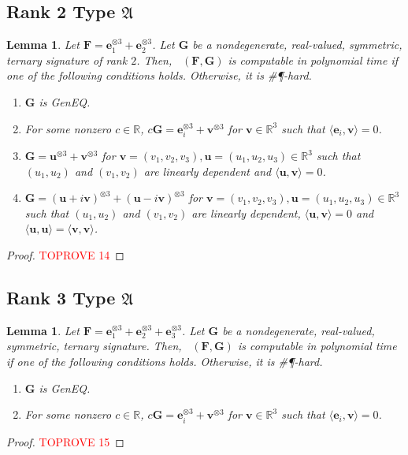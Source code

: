\documentclass[11pt]{article}
\newtheorem{lemma}[theorem]{Lemma}
\DeclareMathOperator{\holts}{Holant^*_3}
\newcommand{\geneq}{\textsf{GenEQ}\xspace}
\newcommand{\sph}{\#\P-hard\xspace}
\newcommand{\teh}{^{\otimes 3}}
\newcommand{\ternarytractgeneq}{$\mathfrak{A}$\xspace}
\begin{document}
\subsection{Rank 2 Type \texorpdfstring{\ternarytractgeneq}{A}}
\begin{lemma}\label{lem:dichotomy-ternary-ternary-rank-2-geneq}
  Let $\mathbf{F} = \mathbf{e}_1\teh + \mathbf{e}_2\teh$.
  Let $\mathbf{G}$ be a nondegenerate, real-valued, symmetric, ternary signature of rank $2$.
  Then, $\holts(\mathbf{F}, \mathbf{G})$ is computable in polynomial time if one of the following conditions holds. Otherwise, it is \sph.
  \begin{enumerate}
    \item $\mathbf{G}$ is \geneq.
    \item For some nonzero $c \in \mathbb{R}$, $c \mathbf{G} = \mathbf{e}_i\teh + \mathbf{v} \teh$ for $\mathbf{v} \in \mathbb{R}^3$ such that $\langle \mathbf{e}_i, \mathbf{v} \rangle = 0$.
    \item $\mathbf{G} = \mathbf{u}\teh + \mathbf{v}\teh$ for $\mathbf{v} = (v_1, v_2, v_3), \mathbf{u} = (u_1, u_2, u_3) \in \mathbb{R}^3$ such that $(u_1, u_2)$ and $(v_1, v_2)$ are linearly dependent and $\langle \mathbf{u}, \mathbf{v} \rangle = 0$.
    \item $\mathbf{G} = (\mathbf{u} + i \mathbf{v})\teh + (\mathbf{u} - i \mathbf{v})\teh$ for $\mathbf{v} = (v_1, v_2, v_3), \mathbf{u} = (u_1, u_2, u_3) \in \mathbb{R}^3$ such that $(u_1, u_2)$ and $(v_1, v_2)$ are linearly dependent, $\langle \mathbf{u}, \mathbf{v} \rangle = 0$ and $\langle \mathbf{u}, \mathbf{u} \rangle = \langle \mathbf{v}, \mathbf{v} \rangle$.
  \end{enumerate}
\end{lemma}
\begin{proof}\textcolor{red}{TOPROVE 14}\end{proof}

\subsection{Rank 3 Type \texorpdfstring{\ternarytractgeneq}{A}}
\begin{lemma}\label{lem:dichotomy-ternary-ternary-rank-3-geneq}
  Let $\mathbf{F} = \mathbf{e}_1\teh + \mathbf{e}_2\teh + \mathbf{e}_3\teh$.
  Let $\mathbf{G}$ be a nondegenerate, real-valued, symmetric, ternary signature.
  Then, $\holts(\mathbf{F}, \mathbf{G})$ is computable in polynomial time if one of the following conditions holds. Otherwise, it is \sph.
  \begin{enumerate}
    \item $\mathbf{G}$ is \geneq.
    \item For some nonzero $c \in \mathbb{R}$, $c \mathbf{G} = \mathbf{e}_i\teh + \mathbf{v} \teh$ for $\mathbf{v} \in \mathbb{R}^3$ such that $\langle \mathbf{e}_i, \mathbf{v} \rangle = 0$.
  \end{enumerate}
\end{lemma}
\begin{proof}\textcolor{red}{TOPROVE 15}\end{proof}
\end{document}
